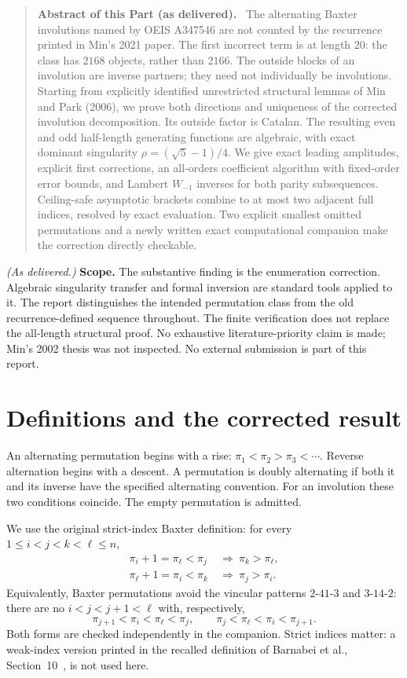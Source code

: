 \documentclass[11pt,letterpaper]{article}
\numberwithin{equation}{section}
\theoremstyle{remark}\newtheorem{remark}[theorem]{Remark}
\newenvironment{partabstract}{\begin{quote}\small\noindent\textbf{Abstract of this Part (as delivered).}\ }{\end{quote}}
\begin{document}
\begin{partabstract}
The alternating Baxter involutions named by OEIS A347546 are not
counted by the recurrence printed in Min's 2021 paper. The first
incorrect term is at length $20$: the class has $2168$ objects,
rather than $2166$. The outside blocks of an involution are inverse
partners; they need not individually be involutions. Starting from
explicitly identified unrestricted structural lemmas of Min and Park
(2006), we prove both directions and uniqueness of the corrected
involution decomposition. Its outside factor is Catalan. The resulting
even and odd half-length generating functions are algebraic, with exact
dominant singularity $\rho=(\sqrt5-1)/4$. We give exact leading
amplitudes, explicit first corrections, an all-orders coefficient
algorithm with fixed-order error bounds, and Lambert $W_{-1}$ inverses
for both parity subsequences. Ceiling-safe asymptotic brackets combine
to at most two adjacent full indices, resolved by exact evaluation.
Two explicit smallest omitted permutations and a newly written exact
computational companion make the correction directly checkable.
\end{partabstract}
\noindent\emph{(As delivered.)} \textbf{Scope.} The substantive finding is the enumeration
correction. Algebraic singularity transfer and formal inversion are
standard tools applied to it. The report distinguishes the intended
permutation class from the old recurrence-defined sequence throughout.
The finite verification does not replace the all-length structural
proof. No exhaustive literature-priority claim is made; Min's 2002
thesis was not inspected. No external submission is part of this report.

\section{Definitions and the corrected result}\label{abx:en:sec:results}
An alternating permutation begins with a rise:
$\pi_1<\pi_2>\pi_3<\cdots$. Reverse alternation begins with a
descent. A permutation is doubly alternating if both it and its inverse
have the specified alternating convention. For an involution these two
conditions coincide. The empty permutation is admitted.

We use the original strict-index Baxter definition: for every
$1\le i<j<k<\ell\le n$,
\begin{align}
 \pi_i+1=\pi_\ell<\pi_j&\ \Longrightarrow\ \pi_k>\pi_\ell,\label{abx:en:eq:baxter1}\\
 \pi_\ell+1=\pi_i<\pi_k&\ \Longrightarrow\ \pi_j>\pi_i.\label{abx:en:eq:baxter2}
\end{align}
Equivalently, Baxter permutations avoid the vincular patterns
$2\text{-}41\text{-}3$ and $3\text{-}14\text{-}2$: there are no
$i<j<j+1<\ell$ with, respectively,
\[
 \pi_{j+1}<\pi_i<\pi_\ell<\pi_j,
 \qquad
 \pi_j<\pi_\ell<\pi_i<\pi_{j+1}.
\]
Both forms are checked independently in the companion. Strict indices
matter: a weak-index version printed in the recalled definition of
Barnabei et al., Section~10~\cite{barnabei}, is not used here.
\end{document}
